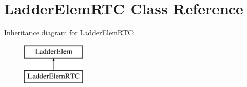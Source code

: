 \hypertarget{class_ladder_elem_r_t_c}{\section{Ladder\-Elem\-R\-T\-C Class Reference}
\label{class_ladder_elem_r_t_c}
}
Inheritance diagram for Ladder\-Elem\-R\-T\-C\-:\begin{figure}[H]
\begin{center}
\leavevmode
\includegraphics[height=2.000000cm]{class_ladder_elem_r_t_c}
\end{center}
\end{figure}
